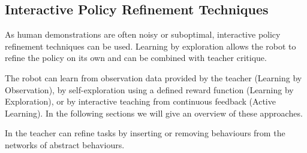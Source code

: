 \subsection{Interactive Policy Refinement Techniques}\label{subsec:Other RP Methods}
As human demonstrations are often noisy or suboptimal, interactive policy refinement techniques can be used.
Learning by exploration allows the robot to refine the policy on its own and can be combined with  teacher critique. 

The robot can learn from observation data provided by the teacher (Learning by Observation), by self-exploration using a defined reward function (Learning by Exploration), or by interactive teaching from continuous feedback (Active Learning). In the following sections we will give an overview of these approaches.

In \cite{nicolescu2003natural} the teacher can refine tasks by inserting or removing behaviours from the networks of abstract behaviours.

%


